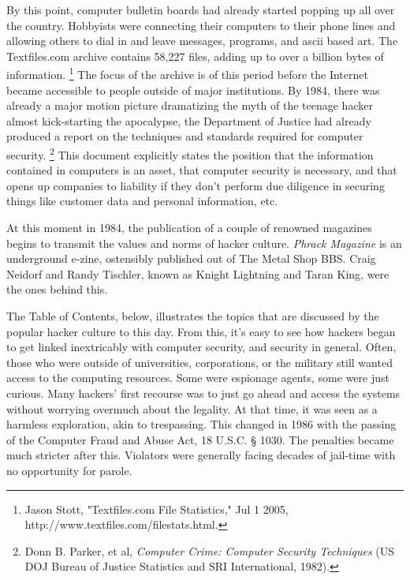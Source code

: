 \documentclass[11pt]{article}
\begin{document}
By this point, computer bulletin boards had already started popping up all over the country. Hobbyists were connecting their computers to their phone lines and allowing others to dial in and leave messages, programs, and ascii based art. The Textfiles.com archive contains 58,227 files, adding up to over a billion bytes of information.
\footnote{Jason Stott, "Textfiles.com File Statistics," Jul 1 2005, http://www.textfiles.com/filestats.html.}
The focus of the archive is of this period before the Internet became accessible to people outside of major institutions. By 1984, there was already a major motion picture dramatizing the myth of the teenage hacker almost kick-starting the apocalypse, the Department of Justice had already produced a report on the techniques and standards required for computer security.
\footnote{Donn B. Parker, et al, \emph{Computer Crime: Computer Security Techniques} (US DOJ Bureau of Justice Statistics and SRI International, 1982).}
This document explicitly states the position that the information contained in computers is an asset, that computer security is necessary, and that opens up companies to liability if they don't perform due diligence in securing things like customer data and personal information, etc.

At this moment in 1984, the publication of a couple of renowned magazines begins to transmit the values and norms of hacker culture. \emph{Phrack Magazine} is an underground e-zine, ostensibly published out of The Metal Shop BBS. Craig Neidorf and Randy Tischler, known as Knight Lightning and Taran King, were the ones behind this.

The Table of Contents, below, illustrates the topics that are discussed by the popular hacker culture to this day.  From this, it's easy to see how hackers began to get linked inextricably with computer security, and security in general. Often, those who were outside of universities, corporations, or the military still wanted access to the computing resources. Some were espionage agents, some were just curious. Many hackers' first recourse was to just go ahead and access the systems without worrying overmuch about the legality. At that time, it was seen as a harmless exploration, akin to trespassing. This changed in 1986 with the passing of the Computer Fraud and Abuse Act, 18 U.S.C. § 1030. The penalties became much stricter after this. Violators were generally facing decades of jail-time with no opportunity for parole.
\end{document}
